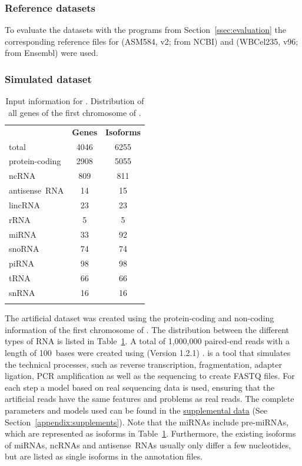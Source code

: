 \documentclass[12pt,a4paper,english]{article}
\begin{document}
\subsubsection*{Reference datasets}
	To evaluate the datasets with the programs from Section~\ref{ssec:evaluation} the corresponding reference files for \ecoli (ASM584, v2; from NCBI) and \celegans (WBCel235, v96; from Ensembl) were used.

\newpage
\subsubsection*{Simulated dataset}
	\label{ssec:simulation}
	\begin{table}
		\centering
		\caption[Input distribution for \flux.]{Input information for \flux. Distribution of all genes of the first chromosome of \celegans.}
		\label{table:input_flux}
		\begin{tabular}{lcc}
			\toprule
			 & \multicolumn{1}{r}{\textbf{Genes}} & \multicolumn{1}{r}{\textbf{Isoforms}} \\ \addlinespace
			\midrule
			total & 4046 & 6255 \\ \addlinespace
			protein-coding & 2908 & 5055 \\ \addlinespace
			ncRNA & 809 & 811 \\ \addlinespace
			antisense~RNA & 14 & 15 \\ \addlinespace
			lincRNA & 23 & 23 \\ \addlinespace
			rRNA & 5 & 5 \\ \addlinespace
			miRNA & 33 & 92 \\ \addlinespace
			snoRNA & 74 & 74 \\ \addlinespace
			piRNA & 98 & 98 \\ \addlinespace
			tRNA & 66 & 66 \\ \addlinespace
			snRNA & 16 & 16 \\ \addlinespace
			\bottomrule
		\end{tabular}
	\end{table}
	The artificial dataset was created using the protein-coding and non-coding information of the first chromosome of \celegans. The distribution between the different types of RNA is listed in Table~\ref{table:input_flux}. A total of 1,000,000 paired-end reads with a length of 100~bases were created using \flux (Version 1.2.1) \citep{flux-simulator}. \flux is a tool that simulates the technical processes, such as reverse transcription, fragmentation, adapter ligation, PCR amplification as well as the sequencing to create FASTQ files. For each step a model based on real sequencing data is used, ensuring that the artificial reads have the same features and problems as real reads. The complete parameters and models used can be found in the \href{https://github.com/lmfaber/master_thesis/tree/master/supplemental_data/flux_simulator}{supplemental data} (See Section~\ref{appendix:supplements}). Note that the \mbox{miRNAs} include pre-miRNAs, which are represented as isoforms in Table~\ref{table:input_flux}. Furthermore, the existing isoforms of \mbox{miRNAs}, \mbox{ncRNAs} and antisense~RNAs usually only differ a few nucleotides, but are listed as single isoforms in the annotation files.
\end{document}

